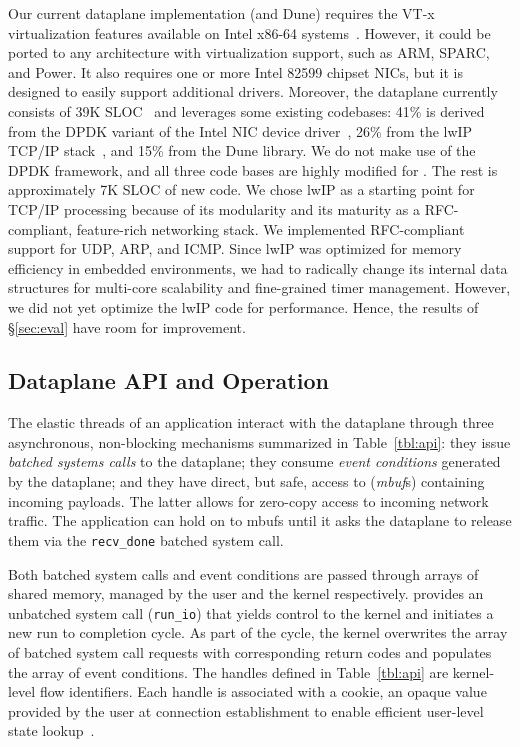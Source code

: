 Our current \ix dataplane implementation (and Dune) requires
the VT-x virtualization features available on Intel x86-64
systems~\cite{DBLP:journals/computer/UhligNRSMABKLS05}. However, it
could be ported to any architecture with virtualization support, such as
ARM, SPARC, and Power. It also requires one or more Intel 82599 chipset NICs,
but it is designed to easily support additional drivers.
Moreover, the \ix dataplane currently consists of 39K
SLOC~\cite{url:sloccount} and leverages some existing codebases:
41\% is derived from
the DPDK variant of the Intel NIC device driver~\cite{intel:dpdk},
26\% from the lwIP TCP/IP stack~\cite{dunkels2001design},
and 15\% from the Dune library.  We do not make use of the DPDK
framework, and all three code bases are
highly modified for \ix. The rest is approximately 7K SLOC
of new code. We chose lwIP as a starting point for TCP/IP processing
because of its modularity and its maturity as a RFC-compliant,
feature-rich networking stack. We implemented RFC-compliant support
for UDP, ARP, and ICMP.  Since lwIP was optimized for memory
efficiency in embedded environments, we had to radically change its
internal data structures for multi-core scalability and fine-grained
timer management. However, we did not yet optimize the lwIP code for
performance. Hence, the results of \S\ref{sec:eval} have room for improvement.


\subsection{Dataplane API and Operation}
\label{sec:impl:api}

The elastic threads of an application interact with the \ix dataplane through three
asynchronous, non-blocking mechanisms summarized in
Table~\ref{tbl:api}: they issue \emph{batched systems calls} to the
dataplane; they consume \emph{event conditions} generated by the
dataplane; and they have direct, but safe, access to (\emph{mbuf}s)
containing incoming payloads.  The latter allows for zero-copy access
to incoming network traffic.  The application can hold on to mbufs
until it asks the dataplane to release them via the
\texttt{recv\_done} batched system call.

Both batched system calls and event conditions are passed through
arrays of shared memory, managed by the user and the kernel
respectively.  \ix provides an unbatched system call
(\texttt{run\_io}) that yields control to the kernel and initiates a
new run to completion cycle. As part of the cycle, the kernel
overwrites the array of batched system call requests with
corresponding return codes and populates the array of event
conditions.  The handles defined in Table~\ref{tbl:api} are
kernel-level flow identifiers. Each handle is associated with a
cookie, an opaque value provided by the user at connection
establishment to enable efficient user-level state
lookup~\cite{DBLP:conf/osdi/HanMCR12}. %

